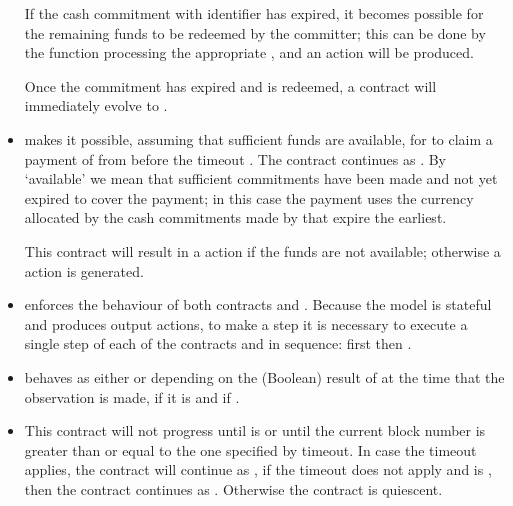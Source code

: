 \documentclass[
      acmsmall
    , screen
    , review=true
  ]{acmart}
\begin{document}
\begin{itemize}
If the cash commitment with identifier  has expired, it becomes possible for the remaining funds to be redeemed by the committer; this can be done by the  function processing the appropriate , and an  action will be produced. 

Once the commitment  has expired and is redeemed, a  contract will immediately evolve to .

\item {} makes it possible, assuming that sufficient funds are available, for  to claim  a payment of  from  before the timeout . The contract continues as . By `available' we mean that sufficient commitments have been made and  not yet expired to cover the payment; in this case the payment  uses the currency allocated by the cash commitments made by  that expire the earliest.

 This contract will result in a  action if the funds are not available; otherwise a  action is generated.

\item {} enforces the behaviour of both contracts  and . Because the model is stateful and produces output actions, to make a step it is necessary to execute a single step of each of  the contracts  and  in sequence: first  then .

\item {} behaves as either  or  depending on the (Boolean) result of  at the time that the observation is made,  if it is  and  if .

\item {} This contract will not progress until  is  or until the current block number is greater than or equal to the one specified by timeout. In case the timeout applies, the contract will continue as , if the timeout does not apply and  is , then the contract continues as . Otherwise the contract is quiescent.
\end{itemize}
\end{document}
